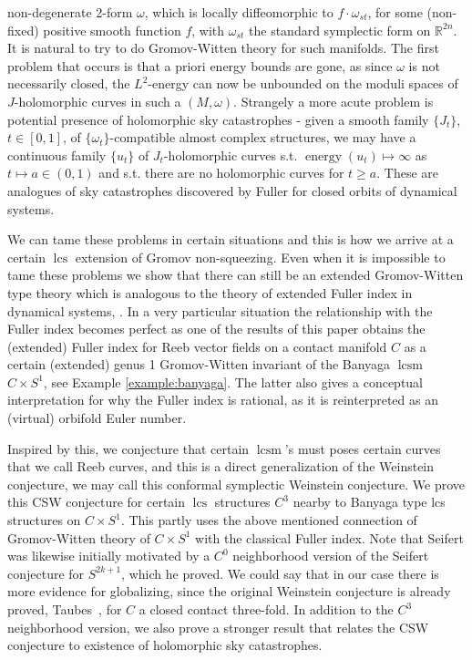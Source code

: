 \documentclass{amsart}
\numberwithin{equation}{section}
\theoremstyle{definition}
\theoremstyle{remark}
\DeclareMathOperator {\energy} {energy}
\DeclareMathOperator{\lcs}{lcs}
\DeclareMathOperator{\lcsm}{lcsm}
\begin{document}
non-degenerate 2-form $\omega$, which is locally diffeomorphic to $
{f} \cdot \omega _{st}  $, for some (non-fixed) positive smooth function $f$, with $\omega _{st}  $ the standard symplectic form on
$\mathbb{R} ^{2n} $. It is natural to try to do Gromov-Witten theory for such manifolds.
The first problem that occurs is that a priori energy bounds are gone, as since $\omega$ is not necessarily closed, the $L ^{2} $-energy can now be unbounded on the moduli spaces of $J$-holomorphic curves in such a $(M,\omega)$. Strangely a more acute problem is potential presence of holomorphic sky catastrophes - given a smooth family $\{J _{t} \}$, $t \in [0,1]$, of $\{\omega _{t} \}$-compatible almost complex structures, we may have a continuous family $\{u _{t} \}$ of $J _{t} $-holomorphic curves s.t. $\energy (u _{t} ) \mapsto \infty$ as $t \mapsto a \in (0,1)$ and s.t. there are no holomorphic curves for $t \geq a$. These are analogues of sky catastrophes discovered by Fuller \cite{citeFullerBlueSky} for closed orbits of dynamical systems.

We can tame these problems in certain situations and this is how we arrive at a certain $\lcs$ extension of Gromov non-squeezing.
Even when it is impossible to tame these problems we show that there can still be an extended Gromov-Witten type theory which is analogous to the theory of extended Fuller index in dynamical systems, \cite{citeSavelyevFuller}. In a very particular situation the relationship with the
Fuller index becomes perfect as one of the results 
of this paper obtains the (extended) Fuller index for Reeb vector fields on a contact manifold $C$ as a
certain (extended) genus 1 Gromov-Witten invariant of the Banyaga $\lcsm$ $C \times S ^{1} $, see Example \ref{example:banyaga}. The
latter also gives a conceptual interpretation for why the Fuller index is
rational, as it is reinterpreted as an (virtual) orbifold Euler number.

Inspired by this, we conjecture that certain $\lcsm$'s must poses certain  curves that we call Reeb curves, and this is a direct generalization of the Weinstein conjecture,  we may call this conformal symplectic Weinstein conjecture.
We prove this CSW conjecture for certain $\lcs$ structures $C ^{3} $ nearby to Banyaga type lcs structures on $C  \times S ^{1}  $. This partly uses the above mentioned connection of Gromov-Witten theory of $C \times S ^{1}  $ with the classical Fuller index. Note that Seifert \cite{citeSeifert} was likewise initially motivated by a $C ^{0} $ neighborhood version of the Seifert conjecture for $S ^{2k+1} $, which he proved. We could say that in our case there is more evidence for globalizing, since the original Weinstein conjecture is already proved, Taubes~\cite{citeTaubesWeinsteinconjecture}, for $C$ a closed contact three-fold. In addition to the $C ^{3} $ neighborhood version, we also prove a stronger result that relates the  CSW conjecture to existence of holomorphic sky catastrophes.
\end{document}
